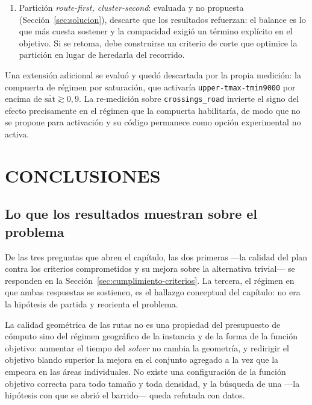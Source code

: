 \begin{enumerate}
  \item Partición \textit{route-first, cluster-second}: evaluada y no propuesta
      (Sección~\ref{sec:solucion}), descarte que los resultados refuerzan: el balance es lo que más
      cuesta sostener y la compacidad exigió un término explícito en el objetivo. Si se retoma,
      debe construirse un criterio de corte que optimice la partición en lugar de heredarla del
      recorrido.
\end{enumerate}

Una extensión adicional se evaluó y quedó descartada por la propia medición: la compuerta de
régimen por saturación, que activaría \texttt{upper-tmax-tmin9000} por encima de
$\overline{\text{sat}} \gtrsim 0{,}9$. La re-medición sobre \texttt{crossings\_road} invierte el
signo del efecto precisamente en el régimen que la compuerta habilitaría, de modo que no se propone
para activación y su código permanece como opción experimental no activa.


\section{CONCLUSIONES}
\label{sec:conclusiones}

\subsection{Lo que los resultados muestran sobre el problema}

De las tres preguntas que abren el capítulo, las dos primeras ---la calidad del plan contra los
criterios comprometidos y su mejora sobre la alternativa trivial--- se responden en la
Sección~\ref{sec:cumplimiento-criterios}. La tercera, el régimen en que ambas respuestas se
sostienen, es el hallazgo conceptual del capítulo: no era la hipótesis de partida y reorienta el
problema.

La calidad geométrica de las rutas no es una propiedad del presupuesto de cómputo sino del régimen
geográfico de la instancia y de la forma de la función objetivo: aumentar el tiempo del
\textit{solver} no cambia la geometría, y redirigir el objetivo blando superior la mejora en el
conjunto agregado a la vez que la empeora en las áreas individuales. No existe una configuración de
la función objetivo correcta para todo tamaño y toda densidad, y la búsqueda de una ---la hipótesis
con que se abrió el barrido--- queda refutada con datos.

